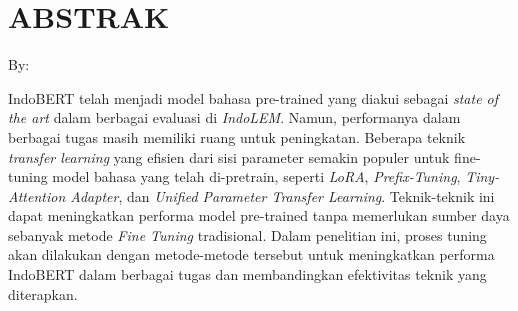 \clearpage
\chapter*{ABSTRAK}

\begin{center}
    \center
    \begin{singlespace}
        \large\bfseries\MakeUppercase{\thetitle}
    
        \normalfont\normalsize
        By:
    
        \bfseries \theauthor
    \end{singlespace}
\end{center} 


\begin{singlespace}
    IndoBERT telah menjadi model bahasa pre-trained yang diakui sebagai \textit{state of the art} dalam berbagai evaluasi di \textit{IndoLEM}.
    Namun, performanya dalam berbagai tugas masih memiliki ruang untuk peningkatan. 
    Beberapa teknik \textit{transfer learning} yang efisien dari sisi parameter semakin populer 
    untuk fine-tuning model bahasa yang telah di-pretrain, seperti \textit{LoRA}, \textit{Prefix-Tuning}, \textit{Tiny-Attention Adapter}, dan \textit{Unified Parameter Transfer Learning}. 
    Teknik-teknik ini dapat meningkatkan performa model pre-trained tanpa memerlukan sumber daya sebanyak metode \textit{Fine Tuning} tradisional. 
    Dalam penelitian ini, proses tuning akan dilakukan dengan metode-metode tersebut untuk meningkatkan performa IndoBERT dalam berbagai tugas dan membandingkan efektivitas teknik yang diterapkan.
\end{singlespace}
\clearpage

\clearpage